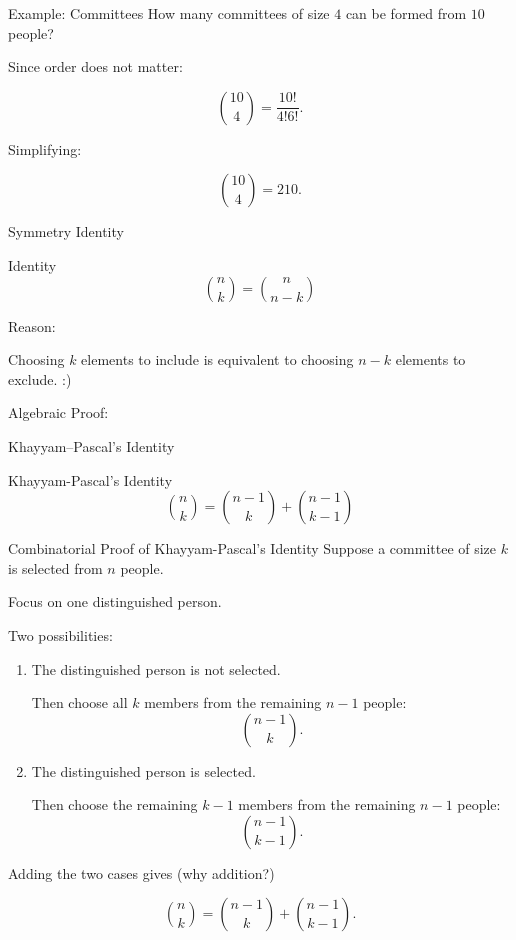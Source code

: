 \begin{frame}{Example: Committees}
How many committees of size $4$ can be formed from $10$ people?

\vspace{0.25cm}

Since order does not matter:

\[
\binom{10}{4}
=
\frac{10!}{4!6!}.
\]

Simplifying:

\[
\binom{10}{4}=210.
\]
\end{frame}


\begin{frame}{Symmetry Identity}
\begin{keybox}{Identity}
\[
\boxed{
\binom{n}{k}
=
\binom{n}{n-k}
}
\]
\end{keybox}

\vspace{0.25cm}

Reason:

Choosing $k$ elements to include is equivalent to choosing $n-k$ elements to exclude. :)


Algebraic Proof:
\end{frame}


\begin{frame}{Khayyam--Pascal's Identity}
\begin{keybox}{Khayyam-Pascal's Identity}
\[
\boxed{
\binom{n}{k}
=
\binom{n-1}{k}
+
\binom{n-1}{k-1}
}
\]
\end{keybox}
\end{frame}

\begin{frame}{Combinatorial Proof of Khayyam-Pascal's Identity}
Suppose a committee of size $k$ is selected from $n$ people.

Focus on one distinguished person.

Two possibilities:

\begin{enumerate}
    \item The distinguished person is not selected.

    Then choose all $k$ members from the remaining $n-1$ people:
    \[
    \binom{n-1}{k}.
    \]

    \item The distinguished person is selected.

    Then choose the remaining $k-1$ members from the remaining $n-1$ people:
    \[
    \binom{n-1}{k-1}.
    \]
\end{enumerate}

Adding the two cases gives (why addition?)

\[
\binom{n}{k}
=
\binom{n-1}{k}
+
\binom{n-1}{k-1}.
\]
\end{frame}


